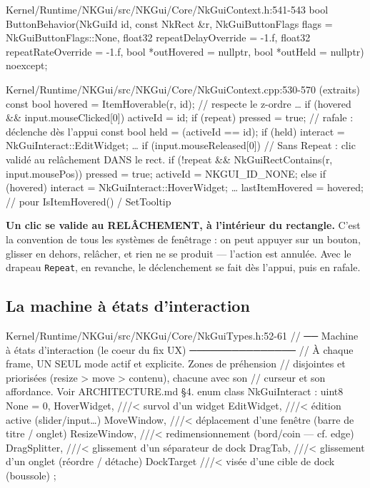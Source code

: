 \begin{nkcode}{Kernel/Runtime/NKGui/src/NKGui/Core/NkGuiContext.h:541-543}
bool ButtonBehavior(NkGuiId id, const NkRect &r, NkGuiButtonFlags flags = NkGuiButtonFlags::None,
                    float32 repeatDelayOverride = -1.f, float32 repeatRateOverride = -1.f,
                    bool *outHovered = nullptr, bool *outHeld = nullptr) noexcept;
\end{nkcode}

\begin{nkcode}{Kernel/Runtime/NKGui/src/NKGui/Core/NkGuiContext.cpp:530-570 (extraits)}
const bool hovered = ItemHoverable(r, id);   // respecte le z-ordre
…
if (hovered && input.mouseClicked[0]) {
    activeId = id;
    if (repeat) pressed = true;              // rafale : déclenche dès l'appui
}
const bool held = (activeId == id);
if (held) {
    interact = NkGuiInteract::EditWidget;
    …
    if (input.mouseReleased[0]) {
        // Sans Repeat : clic validé au relâchement DANS le rect.
        if (!repeat && NkGuiRectContains(r, input.mousePos)) pressed = true;
        activeId = NKGUI_ID_NONE;
    }
} else if (hovered) {
    interact = NkGuiInteract::HoverWidget;
}
…
lastItemHovered = hovered;   // pour IsItemHovered() / SetTooltip
\end{nkcode}

\begin{nkretenir}
\textbf{Un clic se valide au RELÂCHEMENT, à l'intérieur du rectangle.} C'est la
convention de tous les systèmes de fenêtrage : on peut appuyer sur un bouton,
glisser en dehors, relâcher, et rien ne se produit — l'action est annulée. Avec
le drapeau \texttt{Repeat}, en revanche, le déclenchement se fait dès l'appui,
puis en rafale.
\end{nkretenir}

\subsection{La machine à états d'interaction}

\begin{nkcode}{Kernel/Runtime/NKGui/src/NKGui/Core/NkGuiTypes.h:52-61}
// ── Machine à états d'interaction (le coeur du fix UX) ───────────────
// À chaque frame, UN SEUL mode actif et explicite. Zones de préhension
// disjointes et priorisées (resize > move > contenu), chacune avec son
// curseur et son affordance. Voir ARCHITECTURE.md §4.
enum class NkGuiInteract : uint8 {
    None = 0,
    HoverWidget,  ///< survol d'un widget
    EditWidget,   ///< édition active (slider/input…)
    MoveWindow,   ///< déplacement d'une fenêtre (barre de titre / onglet)
    ResizeWindow, ///< redimensionnement (bord/coin — cf. edge)
    DragSplitter, ///< glissement d'un séparateur de dock
    DragTab,      ///< glissement d'un onglet (réordre / détache)
    DockTarget    ///< visée d'une cible de dock (boussole)
};
\end{nkcode}

